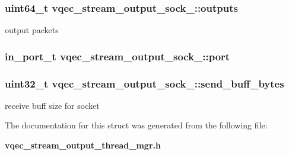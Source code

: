 \subsubsection{\setlength{\rightskip}{0pt plus 5cm}uint64\_\-t \bf{vqec\_\-stream\_\-output\_\-sock\_\-::outputs}}\label{structvqec__stream__output__sock___a0fbb110e615519d587f7f7753193f6f}


output packets 
\subsubsection{\setlength{\rightskip}{0pt plus 5cm}in\_\-port\_\-t \bf{vqec\_\-stream\_\-output\_\-sock\_\-::port}}\label{structvqec__stream__output__sock___748483f671a493ce51dffbf965b5ef79}


\subsubsection{\setlength{\rightskip}{0pt plus 5cm}uint32\_\-t \bf{vqec\_\-stream\_\-output\_\-sock\_\-::send\_\-buff\_\-bytes}}\label{structvqec__stream__output__sock___5605d88c1107b73ff06980fba2612423}


receive buff size for socket 

The documentation for this struct was generated from the following file:\begin{CompactItemize}
\item 
\bf{vqec\_\-stream\_\-output\_\-thread\_\-mgr.h}\end{CompactItemize}
